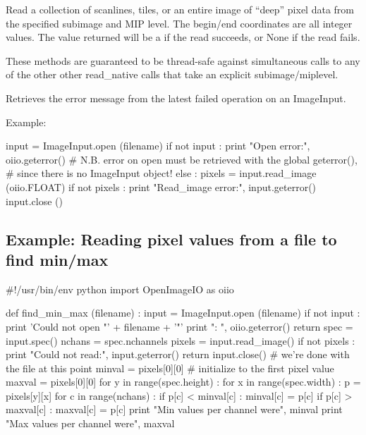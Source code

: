 Read a collection of scanlines, tiles, or an entire image of ``deep'' pixel
data from the specified subimage and MIP level. The begin/end coordinates
are all integer values. The value returned will be a \DeepData if the read
succeeds, or {\cf None} if the read fails.

These methods are guaranteed to be thread-safe against simultaneous calls to
any of the other other {\cf read_native} calls that take an explicit
subimage/miplevel.
\apiend

Retrieves the error message from the latest failed operation on an
ImageInput.

\noindent Example:
\begin{code}
    input = ImageInput.open (filename)
    if not input :
        print "Open error:", oiio.geterror()
        # N.B. error on open must be retrieved with the global geterror(),
        # since there is no ImageInput object!
    else :
        pixels = input.read_image (oiio.FLOAT)
        if not pixels :
            print "Read_image error:", input.geterror()
        input.close ()
\end{code}
\apiend

\newpage
\subsection*{Example: Reading pixel values from a file to find min/max}

\begin{code}
#!/usr/bin/env python 
import OpenImageIO as oiio

def find_min_max (filename) :
    input = ImageInput.open (filename)
    if not input :
        print 'Could not open "' + filename + '"'
        print "\tError: ", oiio.geterror()
        return
    spec = input.spec()
    nchans = spec.nchannels
    pixels = input.read_image()
    if not pixels :
        print "Could not read:", input.geterror()
        return
    input.close()    # we're done with the file at this point
    minval = pixels[0][0]   # initialize to the first pixel value
    maxval = pixels[0][0]
    for y in range(spec.height) :
        for x in range(spec.width) :
            p = pixels[y][x]
            for c in range(nchans) :
                if p[c] < minval[c] :
                    minval[c] = p[c]
                if p[c] > maxval[c] :
                    maxval[c] = p[c]
    print "Min values per channel were", minval
    print "Max values per channel were", maxval
\end{code}
\newpage


